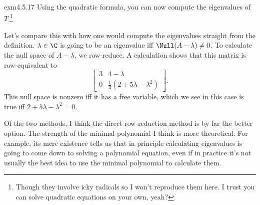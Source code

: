 \begin{exm}{}{exm4.5.17}
	Using the quadratic formula, you can now compute the eigenvalues of $T$.\footnote{Though they involve icky radicals so I won't reproduce them here.  I trust you can solve quadratic equations on your own, yeah?}
	
	\horizontalrule
	
	Let's compare this with how one would compute the eigenvalues straight from the definition.  $\lambda \in \C$ is going to be an eigenvalue iff $\Null (A-\lambda )\neq 0$.  To calculate the null space of $A-\lambda$, we row-reduce.  A calculation shows that this matrix is row-equivalent to
	\begin{equation}
		\begin{bmatrix}3 & 4-\lambda \\ 0 & \tfrac{1}{3}(2+5\lambda -\lambda ^2)\end{bmatrix}.
	\end{equation}
	This null space is nonzero iff it has a free variable, which we see in this case is true iff $2+5\lambda -\lambda ^2=0$.
	
	Of the two methods, I think the direct row-reduction method is by far the better option.  The strength of the minimal polynomial I think is more theoretical.  For example, its mere existence tells us that in principle calculating eigenvalues is going to come down to solving a polynomial equation, even if in practice it's not usually the best idea to use the minimal polynomial to calculate them.
\end{exm}

